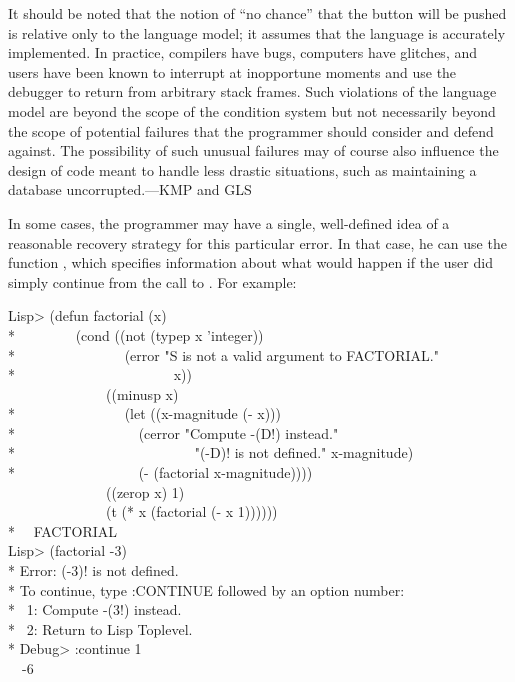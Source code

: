 \beforenoterule
\begin{sideremark}
It should be noted that the notion of
``no chance'' that the button will be pushed is relative only to the language
model; it assumes that the language is accurately implemented.  In practice,
compilers have bugs, computers have glitches, and users have been known
to interrupt at inopportune moments and use the debugger to return from
arbitrary stack frames.  Such violations of the language model are
beyond the scope of the condition system but not necessarily beyond the
scope of potential failures that the programmer should consider and defend against.
The possibility of such unusual failures may of course also influence the design of
code meant to handle less drastic situations,
such as maintaining a database uncorrupted.---KMP and GLS
\end{sideremark}
\afternoterule

In some cases, the programmer may have a single, well-defined idea of a
reasonable recovery strategy for this particular error. In that case, he can
use the function , which specifies information about what would happen
if the user did simply continue from the call to . For example:
\begin{lisp}
Lisp> (defun factorial (x) \\*
~~~~~~~~(cond ((not (typep x 'integer)) \\*
~~~~~~~~~~~~~~~(error "{\Xtilde}S is not a valid argument to FACTORIAL." \\*
~~~~~~~~~~~~~~~~~~~~~~x)) \\
~~~~~~~~~~~~~~((minusp x) \\*
~~~~~~~~~~~~~~~(let ((x-magnitude (- x))) \\*
~~~~~~~~~~~~~~~~~(cerror "Compute -({\Xtilde}D!) instead." \\*
~~~~~~~~~~~~~~~~~~~~~~~~~"(-{\Xtilde}D)! is not defined." x-magnitude) \\*
~~~~~~~~~~~~~~~~~(- (factorial x-magnitude)))) \\
~~~~~~~~~~~~~~((zerop x) 1) \\
~~~~~~~~~~~~~~(t (* x (factorial (- x 1)))))) \\*
~\EV\ FACTORIAL \\
Lisp> (factorial -3) \\*
Error: (-3)! is not defined. \\*
To continue, type :CONTINUE followed by an option number: \\*
~1: Compute -(3!) instead. \\*
~2: Return to Lisp Toplevel. \\*
Debug> :continue 1 \\
~\EV\ -6
\end{lisp}

